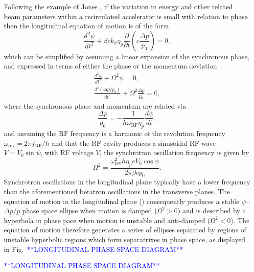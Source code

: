 \documentclass[../main.tex]{subfiles}
\begin{document}
Following the example of Jones \cite{jones2016design}, if the variation in energy and other related beam parameters within a recirculated accelerator is small with relation to phase then the longitudinal equation of motion is of the form 
\begin{equation}
\frac{d^{2}\psi}{dt^{2}} + \beta ck_{h}\eta_{p}\frac{\partial}{\partial t}\left(c\frac{\Delta p}{p_{0}}\right) = 0,
\label{eq:longitudinal_equation_of_motion}
\end{equation}
which can be simplified by assuming a linear expansion of the synchronous phase, and expressed in terms of either the phase or the momentum deviation
\begin{align}
\frac{d^{2}\psi}{dt^{2}} + \Omega^{2}\psi = 0,
\label{eq:longitudinal_equation_of_motion_phase} \\
\frac{d^{2}\left(\Delta p/p_{0}\right)}{dt^{2}} + \Omega^{2}\frac{\Delta p}{p_{0}} = 0,
\label{eq:longitudinal_equation_of_motion_momentum}
\end{align}
where the synchronous phase and momentum are related via
\begin{equation}
\frac{\Delta p}{p_{0}} = -\frac{1}{h\omega_{\mathrm{RF}}\eta_{p}}\frac{d\psi}{dt},
\label{eq:momentum_synchronous_phase_relation}    
\end{equation}
and assuming the RF frequency is a harmonic of the revolution frequency $\omega_{\mathrm{rev}}=2\pi f_{\mathrm{RF}}/h$ and that the RF cavity produces a sinusoidal RF wave $V=V_{0}\sin\psi$, with RF voltage $V$, the synchrotron oscillation frequency is given by
\begin{equation}
\Omega^{2} = \frac{\omega_{\mathrm{rev}}^{2}h\eta_{p}eV_{0}\cos\psi}{2\pi\beta cp_{0}}.
\label{eq:synchrotron_oscillation_frequency}    
\end{equation}
Synchrotron oscillations in the longitudinal plane typically have a lower frequency than the aforementioned betatron oscillations in the transverse planes. The equation of motion in the longitudinal plane () consequently produces a stable $\psi$--$\Delta p/p$ phase space ellipse when motion is damped ($\Omega^{2}>0$) and is described by a hyperbola in phase pace when motion is unstable and anti-damped ($\Omega^{2}<0$). The equation of motion therefore generates a series of ellipses separated by regions of unstable hyperbolic regions which form separatrixes in phase space, as displayed in Fig.~\textcolor{blue}{**LONGITUDINAL PHASE SPACE DIAGRAM**}

\textcolor{blue}{**LONGITUDINAL PHASE SPACE DIAGRAM**}
\end{document}
